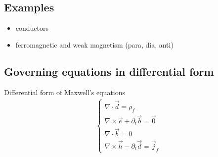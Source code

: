 \documentclass[letterpaper,10pt,english]{jupyterBook}
\begin{document}
\subsection{Examples}
\label{\detokenize{ch/principles-matter:examples}}\begin{itemize}
\item {} 
\sphinxAtStartPar
conductors

\item {} 
\sphinxAtStartPar
ferromagnetic and weak magnetism (para\sphinxhyphen{}, dia\sphinxhyphen{}, anti\sphinxhyphen{})

\end{itemize}


\subsection{Governing equations in differential form}
\label{\detokenize{ch/principles-matter:governing-equations-in-differential-form}}\label{\detokenize{ch/principles-matter:classical-electromagnetism-media-differential}}
\sphinxAtStartPar
Differential form of Maxwell’s equations
\begin{equation*}
\begin{split}\begin{cases}
 \nabla \cdot \vec{d} = \rho_f \\
 \nabla \times \vec{e} + \partial_t \vec{b} = \vec{0} \\
 \nabla \cdot \vec{b} = 0 \\
 \nabla \times \vec{h} - \partial_t \vec{d} = \vec{j}_f
\end{cases}\end{split}
\end{equation*}
\sphinxAtStartPar
{} 
\end{document}
